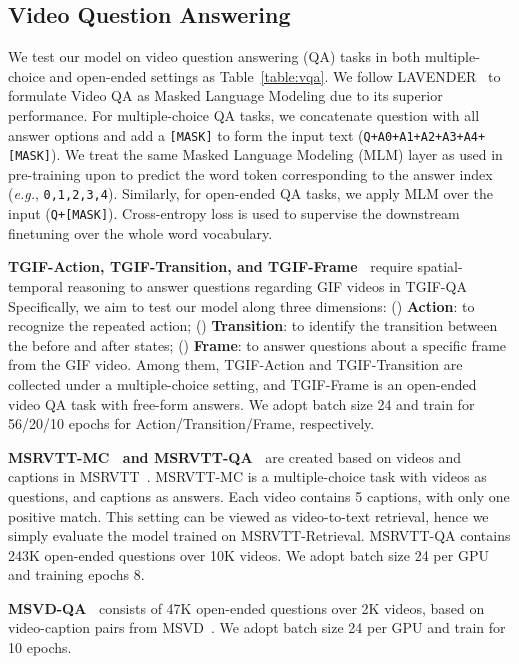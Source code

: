 \documentclass[10pt,twocolumn,letterpaper]{article}
\begin{document}
\subsection{Video Question Answering}
We test our model on video question answering (QA) tasks in both multiple-choice and open-ended settings as Table~\ref{table:vqa}. We follow LAVENDER~\cite{li2022lavender} to formulate Video QA as Masked Language Modeling due to its superior performance. For multiple-choice QA tasks, we concatenate question with all answer options and add a \texttt{[MASK]} to form the input text (\texttt{Q+A0+A1+A2+A3+A4+[MASK]}). We treat the same Masked Language Modeling (MLM) layer as used in pre-training upon  to predict the word token corresponding to the answer index (\textit{e.g.}, \texttt{0,1,2,3,4}). Similarly, for open-ended QA tasks, we apply MLM over the input (\texttt{Q+[MASK]}). Cross-entropy loss is used to supervise the downstream finetuning over the whole word vocabulary.

\vspace{0.5ex}
\noindent \textbf{TGIF-Action, TGIF-Transition, and TGIF-Frame~\cite{jang2017tgif-qa}}
require spatial-temporal reasoning to answer questions regarding GIF videos in TGIF-QA Specifically, we aim to test our model along three dimensions: () \textbf{Action}: to recognize the repeated action; () \textbf{Transition}: to identify the transition between the before and after states; () \textbf{Frame}: to answer questions about a specific frame from the GIF video. Among them, TGIF-Action and TGIF-Transition are collected under a multiple-choice setting, and TGIF-Frame is an open-ended video QA task with free-form answers. We adopt batch size 24 and train for 56/20/10 epochs for Action/Transition/Frame, respectively.

\vspace{0.5ex}
\noindent \textbf{MSRVTT-MC~\cite{yu2018js-fusion} and MSRVTT-QA~\cite{xu2017msrvtt-qa}}
are created based on videos and captions in MSRVTT~\cite{xu2016msrvtt}. MSRVTT-MC is a multiple-choice task with videos as questions, and captions as answers. Each video contains 5 captions, with only one positive match. This setting can be viewed as video-to-text retrieval, hence we simply evaluate the model trained on MSRVTT-Retrieval.  MSRVTT-QA contains 243K open-ended questions over 10K videos. We adopt batch size 24 per GPU and training epochs 8.

\vspace{0.5ex}
\noindent \textbf{MSVD-QA~\cite{xu2017msrvtt-qa}}
consists of 47K open-ended questions over 2K videos, based on video-caption pairs from MSVD~\cite{chen2011msvd-qa}. We adopt batch size 24 per GPU and train for 10 epochs.
\end{document}
